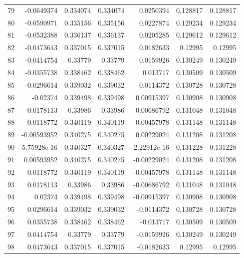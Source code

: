\begin{tabular}{rrrrrrr}
  79 & -0.0649374   & 0.334074    & 0.334074    &  0.0250394   & 0.128817    & 0.128817    \\
  80 & -0.0590971   & 0.335156    & 0.335156    &  0.0227874   & 0.129234    & 0.129234    \\
  81 & -0.0532388   & 0.336137    & 0.336137    &  0.0205285   & 0.129612    & 0.129612    \\
  82 & -0.0473643   & 0.337015    & 0.337015    &  0.0182633   & 0.12995     & 0.12995     \\
  83 & -0.0414754   & 0.33779     & 0.33779     &  0.0159926   & 0.130249    & 0.130249    \\
  84 & -0.0355738   & 0.338462    & 0.338462    &  0.013717    & 0.130509    & 0.130509    \\
  85 & -0.0296614   & 0.339032    & 0.339032    &  0.0114372   & 0.130728    & 0.130728    \\
  86 & -0.02374     & 0.339498    & 0.339498    &  0.00915397  & 0.130908    & 0.130908    \\
  87 & -0.0178113   & 0.33986     & 0.33986     &  0.00686792  & 0.131048    & 0.131048    \\
  88 & -0.0118772   & 0.340119    & 0.340119    &  0.00457978  & 0.131148    & 0.131148    \\
  89 & -0.00593952  & 0.340275    & 0.340275    &  0.00229024  & 0.131208    & 0.131208    \\
  90 &  5.75928e-16 & 0.340327    & 0.340327    & -2.22912e-16 & 0.131228    & 0.131228    \\
  91 &  0.00593952  & 0.340275    & 0.340275    & -0.00229024  & 0.131208    & 0.131208    \\
  92 &  0.0118772   & 0.340119    & 0.340119    & -0.00457978  & 0.131148    & 0.131148    \\
  93 &  0.0178113   & 0.33986     & 0.33986     & -0.00686792  & 0.131048    & 0.131048    \\
  94 &  0.02374     & 0.339498    & 0.339498    & -0.00915397  & 0.130908    & 0.130908    \\
  95 &  0.0296614   & 0.339032    & 0.339032    & -0.0114372   & 0.130728    & 0.130728    \\
  96 &  0.0355738   & 0.338462    & 0.338462    & -0.013717    & 0.130509    & 0.130509    \\
  97 &  0.0414754   & 0.33779     & 0.33779     & -0.0159926   & 0.130249    & 0.130249    \\
  98 &  0.0473643   & 0.337015    & 0.337015    & -0.0182633   & 0.12995     & 0.12995     \\

\end{tabular}
